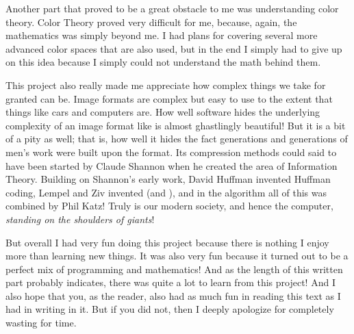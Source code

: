 Another part that proved to be a great obstacle to me was
understanding color theory. Color Theory proved very difficult for me,
because, again, the mathematics was simply beyond me. I had plans for
covering several more advanced color spaces that are also used, but in
the end I simply had to give up on this idea because I simply could
not understand the math behind them.

This project also really made me appreciate how complex things we take
for granted can be. Image formats are complex but easy to use to the
extent that things like cars and computers are. How well software
hides the underlying complexity of an image format like \png is almost
ghastlingly beautiful! But it is a bit of a pity as well; that is, how
well it hides the fact generations and generations of men's work were
built upon the format. Its compression methods could said to have been
started by Claude Shannon when he created the area of Information
Theory. Building on Shannon's early work, David Huffman invented
Huffman coding, Lempel and Ziv invented \lzone(and \lztwo), and in the
 algorithm all of this was combined by Phil Katz! Truly is our
modern society, and hence the computer, \textit{standing on the
  shoulders of giants}!


But overall I had very fun doing this project because there is nothing
I enjoy more than learning new things. It was also very fun because it
turned out to be a perfect mix of programming and mathematics! And as
the length of this written part probably indicates, there was quite a
lot to learn from this project! And I also hope that you, as the
reader, also had as much fun in reading this text as I had in writing
in it. But if you did not, then I deeply apologize for completely
wasting for time.
